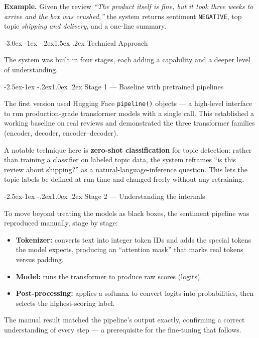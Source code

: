 \documentclass[11pt]{article}
\makeatletter
\newcommand{\code}[1]{\texttt{\small #1}}
\renewcommand{\section}{\@startsection{section}{1}{\z@}%
  {-3.0ex \@plus -1ex \@minus -.2ex}{1.5ex \@plus.2ex}%
  {\Large\bfseries\color{primarycolor}}}
\renewcommand{\subsection}{\@startsection{subsection}{2}{\z@}%
  {-2.5ex\@plus -1ex \@minus -.2ex}{1.0ex \@plus .2ex}%
  {\large\bfseries}}
\makeatother
\begin{document}
\textbf{Example.} Given the review \emph{``The product itself is fine, but it took
three weeks to arrive and the box was crushed,''} the system returns sentiment
\code{NEGATIVE}, top topic \emph{shipping and delivery}, and a one-line summary.

\section{Technical Approach}

The system was built in four stages, each adding a capability and a deeper level
of understanding.

\subsection{Stage 1 --- Baseline with pretrained pipelines}

The first version used Hugging Face \code{pipeline()} objects --- a high-level
interface to run production-grade transformer models with a single call. This
established a working baseline on real reviews and demonstrated the three
transformer families (encoder, decoder, encoder--decoder).

A notable technique here is \textbf{zero-shot classification} for topic
detection: rather than training a classifier on labeled topic data, the system
reframes ``is this review about shipping?'' as a natural-language-inference
question. This lets the topic labels be defined at run time and changed freely
without any retraining.

\subsection{Stage 2 --- Understanding the internals}

To move beyond treating the models as black boxes, the sentiment pipeline was
reproduced manually, stage by stage:
\begin{itemize}
    \item \textbf{Tokenizer:} converts text into integer token IDs and adds the
    special tokens the model expects, producing an ``attention mask'' that marks
    real tokens versus padding.
    \item \textbf{Model:} runs the transformer to produce raw scores (logits).
    \item \textbf{Post-processing:} applies a softmax to convert logits into
    probabilities, then selects the highest-scoring label.
\end{itemize}
The manual result matched the pipeline's output exactly, confirming a correct
understanding of every step --- a prerequisite for the fine-tuning that follows.
\end{document}
